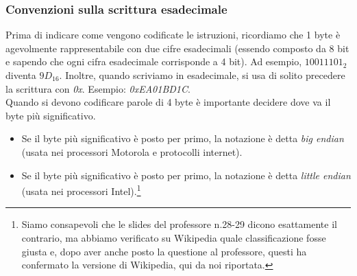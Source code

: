 \documentclass[class=book, crop=false]{standalone}
\begin{document}
\subsubsection{Convenzioni sulla scrittura esadecimale}
Prima di indicare come vengono codificate le istruzioni, ricordiamo che 1 byte è agevolmente rappresentabile con due cifre esadecimali (essendo composto da 8 bit e sapendo che ogni cifra esadecimale corrisponde a 4 bit). Ad esempio, \(1001 1101_{2}\) diventa \(9D_{16}\). Inoltre, quando scriviamo in esadecimale, si usa di solito precedere la scrittura con \emph{0x}. Esempio: \emph{0xEA01BD1C}.\\
Quando si devono codificare parole di 4 byte è importante decidere dove va il byte più significativo.
\begin{itemize}[nolistsep]
	\item Se il byte più significativo è posto per primo, la notazione è detta \emph{big endian} (usata nei processori Motorola e protocolli internet).
	\item Se il byte più significativo è posto per primo, la notazione è detta \emph{little endian} (usata nei processori Intel).\footnote{Siamo consapevoli che le slides del professore n.28-29 dicono esattamente il contrario, ma abbiamo verificato su Wikipedia quale classificazione fosse giusta e, dopo aver anche posto la questione al professore, questi ha confermato la versione di Wikipedia, qui da noi riportata.}
\end{itemize}
\end{document}
